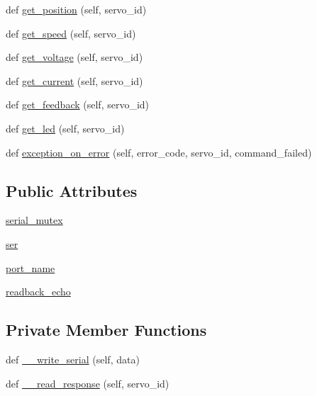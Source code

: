 \begin{DoxyCompactItemize}
\item 
def \hyperlink{classdynamixel__driver_1_1dynamixel__io_1_1_dynamixel_i_o_ac0f3bb1c05808fb34281f30ba9c43800}{get\+\_\+position} (self, servo\+\_\+id)
\item 
def \hyperlink{classdynamixel__driver_1_1dynamixel__io_1_1_dynamixel_i_o_abe3496d8e3d3dea89509f354b009b326}{get\+\_\+speed} (self, servo\+\_\+id)
\item 
def \hyperlink{classdynamixel__driver_1_1dynamixel__io_1_1_dynamixel_i_o_af5a22d82fcdd6fcbe0823c763f7bcc4d}{get\+\_\+voltage} (self, servo\+\_\+id)
\item 
def \hyperlink{classdynamixel__driver_1_1dynamixel__io_1_1_dynamixel_i_o_aac11f861a1d7b67bb5976a43ea69b092}{get\+\_\+current} (self, servo\+\_\+id)
\item 
def \hyperlink{classdynamixel__driver_1_1dynamixel__io_1_1_dynamixel_i_o_a91841058e6c53561236ab08762438d52}{get\+\_\+feedback} (self, servo\+\_\+id)
\item 
def \hyperlink{classdynamixel__driver_1_1dynamixel__io_1_1_dynamixel_i_o_a1080dc1550b89b705ed7995ef4e67349}{get\+\_\+led} (self, servo\+\_\+id)
\item 
def \hyperlink{classdynamixel__driver_1_1dynamixel__io_1_1_dynamixel_i_o_a2276d95fa505e09758d500731edf5753}{exception\+\_\+on\+\_\+error} (self, error\+\_\+code, servo\+\_\+id, command\+\_\+failed)
\end{DoxyCompactItemize}
\subsection*{Public Attributes}
\begin{DoxyCompactItemize}
\item 
\hyperlink{classdynamixel__driver_1_1dynamixel__io_1_1_dynamixel_i_o_a67bb8729caac5df92342f0a0cb57ec8d}{serial\+\_\+mutex}
\item 
\hyperlink{classdynamixel__driver_1_1dynamixel__io_1_1_dynamixel_i_o_aa8889993f9c5ee4c23b535d81027bc77}{ser}
\item 
\hyperlink{classdynamixel__driver_1_1dynamixel__io_1_1_dynamixel_i_o_ae4ec71fd84ab8709471d21970a070e31}{port\+\_\+name}
\item 
\hyperlink{classdynamixel__driver_1_1dynamixel__io_1_1_dynamixel_i_o_a5cc6e8617f26fe6af8add33bee3544fe}{readback\+\_\+echo}
\end{DoxyCompactItemize}
\subsection*{Private Member Functions}
\begin{DoxyCompactItemize}
\item 
def \hyperlink{classdynamixel__driver_1_1dynamixel__io_1_1_dynamixel_i_o_a6fb06ef65f812dccf51f320618892a1b}{\+\_\+\+\_\+write\+\_\+serial} (self, data)
\item 
def \hyperlink{classdynamixel__driver_1_1dynamixel__io_1_1_dynamixel_i_o_a0e0e863880f961a4dcffb12274db9fa6}{\+\_\+\+\_\+read\+\_\+response} (self, servo\+\_\+id)
\end{DoxyCompactItemize}


